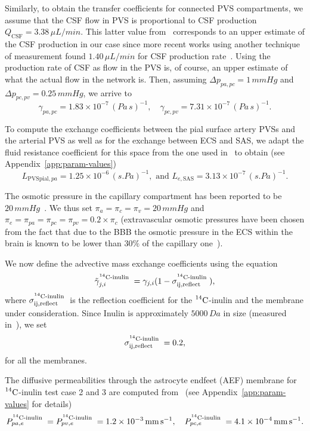 \documentclass[a4paper,11pt]{article}
\newcommand{\1}{^{(1)}}
\newcommand{\2}{^{(2)}}
\newcommand{\Cinulin}{$\prescript{14}{}{\text{C}}$-inulin }
\begin{document}
Similarly, to obtain the transfer coefficients for connected PVS compartments, we assume that the CSF flow in PVS is proportional to CSF production $Q_\text{CSF} = 3.38 \,\si{\mu L/min}$. This latter value from~\cite{CHODOBSKI1998205} corresponds to an upper estimate of the CSF production in our case since more recent works using another technique of measurement found $1.40\,\si{\mu L/min}$ for CSF production rate~\cite{KARIMY201578}. Using the production rate of CSF as flow in the PVS is, of course, an upper estimate of what the actual flow in the network is. Then, assuming $\Delta p_{pa,pc} = 1\,\si{mmHg}$ and $\Delta p_{pc,pv} = 0.25 \, \si{mmHg}$, we arrive to 
\[
    \gamma_{pa,pc} = 1.83 \times 10^{-7}\, \si{(Pa\,s)^{-1}},\quad \gamma_{pc,pv} = 7.31  \times 10^{-7}\, \si{(Pa\,s)^{-1}}.
\]



To compute the exchange coefficients between the pial surface artery PVSs and the arterial PVS as well as for the exchange between ECS and SAS, we adapt the fluid resistance coefficient for this space from the one used in~\cite{Vinje-2020-ICP} to obtain (see Appendix~\ref{app:param-values})
\[
    L_{\text{PVSpial},pa} =  1.25 \times 10^{-6} \, \si{(s.Pa)^{-1}},\text{ and }L_{e,\text{SAS}}  =  3.13\times 10^{-7} \,\si{(s.Pa)^{-1}}.
\]

The osmotic pressure in the capillary compartment has been reported to be $20 \, \si{mmHg}$~\cite{Levick-1991-Capillary}. We thus set $\pi_a = \pi_c = \pi_v = 20 \, \si{mmHg}$ and $\pi_e = \pi_{pa} = \pi_{pc} = \pi_{pv} = 0.2\times \pi_c$ (extravascular osmotic pressures have been chosen from the fact that due to the BBB the osmotic pressure in the ECS within the brain is known to be lower than $30\%$ of the capillary one~\cite{Levick-1991-Capillary}).



We now define the advective mass exchange coefficients using the equation
\[
    \tilde \gamma_{j,i}^{\text{\Cinulin}} = \gamma_{j,i}(1-\sigma^{\text{\Cinulin}}_\text{ij,reflect}),  
\]
where $\sigma^\text{\Cinulin}_\text{ij,reflect}$ is the reflection coefficient for the \Cinulin and the membrane under consideration.
Since Inulin is approximately $5000 \, \si{Da}$ in size (measured in~\cite{trainor1982transcapillary}), we set  
\[
    \sigma^\text{\Cinulin}_\text{ij,reflect} = 0.2,
\]
for all the membranes.

The diffusive permeabilities through the astrocyte endfeet (AEF) membrane for \Cinulin test case 2 and 3 are computed from~\cite{Li-2010-model, Michel-1999-permeablity} (see Appendix~\ref{app:param-values} for details)
\[
    P^{\text{\Cinulin}}_{pa,e} =  P^{\text{\Cinulin}}_{pv,e} =  1.2\times 10^{-3}\, \si{mm.s^{-1}},\quad P^{\text{\Cinulin}}_{pc,e} = 4.1\times 10^{-4} \, \si{mm.s^{-1}}.
\]
\end{document}
